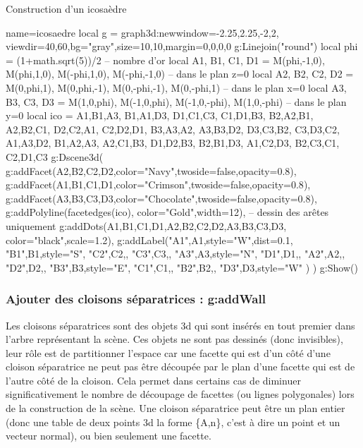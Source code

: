 \begin{demo}{Construction d'un icosaèdre}
\begin{luadraw}{name=icosaedre}
local g = graph3d:new{window={-2.25,2.25,-2,2}, viewdir={40,60},bg="gray",size={10,10},margin={0,0,0,0}}
g:Linejoin("round")
local phi = (1+math.sqrt(5))/2 -- nombre d'or
local A1, B1, C1, D1 = M(phi,-1,0), M(phi,1,0), M(-phi,1,0), M(-phi,-1,0) -- dans le plan z=0
local A2, B2, C2, D2 = M(0,phi,1), M(0,phi,-1), M(0,-phi,-1), M(0,-phi,1) -- dans le plan x=0
local A3, B3, C3, D3 = M(1,0,phi), M(-1,0,phi), M(-1,0,-phi), M(1,0,-phi) -- dans le plan y=0
local ico = {   {A1,B1,A3}, {B1,A1,D3}, {D1,C1,C3}, {C1,D1,B3},
                {B2,A2,B1}, {A2,B2,C1}, {D2,C2,A1}, {C2,D2,D1},
                {B3,A3,A2}, {A3,B3,D2}, {D3,C3,B2}, {C3,D3,C2},
                {A1,A3,D2}, {B1,A2,A3}, {A2,C1,B3}, {D1,D2,B3},
                {B2,B1,D3}, {A1,C2,D3}, {B2,C3,C1}, {C2,D1,C3}  }
g:Dscene3d(
    g:addFacet({A2,B2,C2,D2},{color="Navy",twoside=false,opacity=0.8}),
    g:addFacet({A1,B1,C1,D1},{color="Crimson",twoside=false,opacity=0.8}),
    g:addFacet({A3,B3,C3,D3},{color="Chocolate",twoside=false,opacity=0.8}),
    g:addPolyline(facetedges(ico), {color="Gold",width=12}), -- dessin des arêtes uniquement
    g:addDots({A1,B1,C1,D1,A2,B2,C2,D2,A3,B3,C3,D3}, {color="black",scale=1.2}),
    g:addLabel("A1",A1,{style="W",dist=0.1}, "B1",B1,{style="S"}, "C2",C2,{}, "C3",C3,{}, "A3",A3,{style="N"}, "D1",D1,{},  "A2",A2,{},  "D2",D2,{}, "B3",B3,{style="E"}, "C1",C1,{}, "B2",B2,{}, "D3",D3,{style="W"} )
)
g:Show()
\end{luadraw}
\end{demo}

\subsubsection{Ajouter des cloisons séparatrices : g:addWall}

Les cloisons séparatrices sont des objets 3d qui sont insérés en tout premier dans l'arbre représentant la scène. Ces objets ne sont pas dessinés (donc invisibles), leur rôle est de partitionner l'espace car une facette qui est d'un côté d'une cloison séparatrice ne peut pas être découpée par le plan d'une facette qui est de l'autre côté de la cloison. Cela permet dans certains cas de diminuer significativement le nombre de découpage de facettes (ou lignes polygonales) lors de la construction de la scène. Une cloison séparatrice peut être un plan entier (donc une table de deux points 3d la forme \{A,n\}, c'est à dire un point et un vecteur normal), ou bien seulement une facette.


